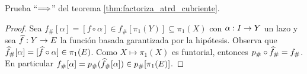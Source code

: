 \begin{ejercicio}\label{ej:27}
  Prueba ``$\Longrightarrow$'' del teorema \ref{thm:factoriza_atrd_cubriente}.
\end{ejercicio}
\begin{proof}%
  Sea $f_{\#}[\alpha]=[f\circ\alpha]\in f_{\#}[\pi_1(Y)]\subseteq \pi_1(X)$ con
  $\alpha:I\rightarrow Y$ un lazo y sea $\widehat{ f }:Y\rightarrow E$ la funci\'on basada garantizada por la hip\'otesis.
  Observa que $\widehat{ f }_{\#}[\alpha]=[\widehat{ f }\circ\alpha]\in\pi_1(E)$.
  Como $X\mapsto \pi_1(X)$ es funtorial, entonces $p_{\#}\circ\widehat{ f }_{\#}=f_{\#}$. En particular
  $f_{\#}[\alpha]=p_{\#}(\widehat{ f }_{\#}[\alpha])\in p_{\#}[\pi_1(E)]$.
  
  
\end{proof}%

